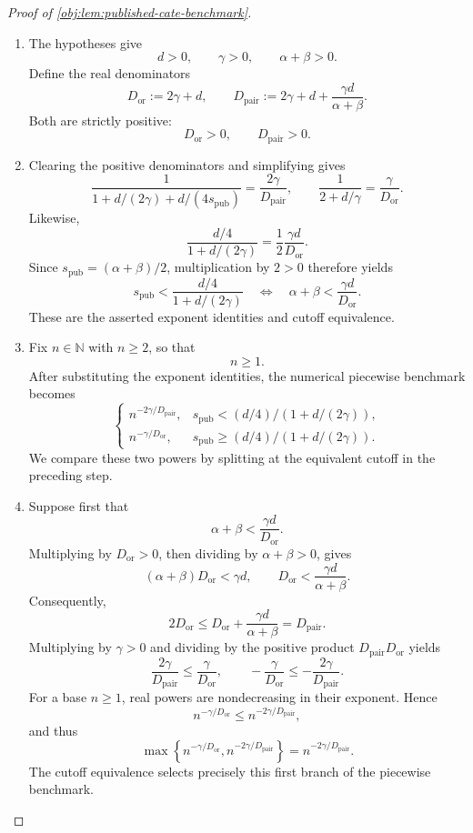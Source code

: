 \documentclass[11pt]{article}
\begin{document}
\begin{proof}[Proof of \cref{obj:lem:published-cate-benchmark}]
\begin{enumerate}
\item The hypotheses give
\[
d>0,\qquad \gamma>0,\qquad \alpha+\beta>0.
\]
Define the real denominators
\[
D_{\mathrm{or}}:=2\gamma+d,
\qquad
D_{\mathrm{pair}}:=2\gamma+d+\frac{\gamma d}{\alpha+\beta}.
\]
Both are strictly positive:
\[
D_{\mathrm{or}}>0,\qquad D_{\mathrm{pair}}>0.
\]

\item Clearing the positive denominators and simplifying gives
\[
\frac{1}{1+d/(2\gamma)+d/(4s_{\mathrm{pub}})}
=\frac{2\gamma}{D_{\mathrm{pair}}},
\qquad
\frac{1}{2+d/\gamma}
=\frac{\gamma}{D_{\mathrm{or}}}.
\]
Likewise,
\[
\frac{d/4}{1+d/(2\gamma)}
=\frac{1}{2}\frac{\gamma d}{D_{\mathrm{or}}}.
\]
Since \(s_{\mathrm{pub}}=(\alpha+\beta)/2\), multiplication by \(2>0\) therefore yields
\[
s_{\mathrm{pub}}<\frac{d/4}{1+d/(2\gamma)}
\quad\Longleftrightarrow\quad
\alpha+\beta<\frac{\gamma d}{D_{\mathrm{or}}}.
\]
These are the asserted exponent identities and cutoff equivalence.

\item Fix \(n\in\mathbb N\) with \(n\ge2\), so that
\[
n\ge1.
\]
After substituting the exponent identities, the numerical piecewise benchmark becomes
\[
\begin{cases}
n^{-2\gamma/D_{\mathrm{pair}}},
& s_{\mathrm{pub}}<(d/4)/(1+d/(2\gamma)),\\
n^{-\gamma/D_{\mathrm{or}}},
& s_{\mathrm{pub}}\ge(d/4)/(1+d/(2\gamma)).
\end{cases}
\]
We compare these two powers by splitting at the equivalent cutoff in the preceding step.

\item Suppose first that
\[
\alpha+\beta<\frac{\gamma d}{D_{\mathrm{or}}}.
\]
Multiplying by \(D_{\mathrm{or}}>0\), then dividing by \(\alpha+\beta>0\), gives
\[
(\alpha+\beta)D_{\mathrm{or}}<\gamma d,
\qquad
D_{\mathrm{or}}<\frac{\gamma d}{\alpha+\beta}.
\]
Consequently,
\[
2D_{\mathrm{or}}
\le D_{\mathrm{or}}+\frac{\gamma d}{\alpha+\beta}
=D_{\mathrm{pair}}.
\]
Multiplying by \(\gamma>0\) and dividing by the positive product
\(D_{\mathrm{pair}}D_{\mathrm{or}}\) yields
\[
\frac{2\gamma}{D_{\mathrm{pair}}}
\le\frac{\gamma}{D_{\mathrm{or}}},
\qquad
-\frac{\gamma}{D_{\mathrm{or}}}
\le-\frac{2\gamma}{D_{\mathrm{pair}}}.
\]
For a base \(n\ge1\), real powers are nondecreasing in their exponent. Hence
\[
n^{-\gamma/D_{\mathrm{or}}}
\le n^{-2\gamma/D_{\mathrm{pair}}},
\]
and thus
\[
\max\left\{
n^{-\gamma/D_{\mathrm{or}}},
n^{-2\gamma/D_{\mathrm{pair}}}
\right\}
=n^{-2\gamma/D_{\mathrm{pair}}}.
\]
The cutoff equivalence selects precisely this first branch of the piecewise benchmark.


\end{enumerate}
\end{proof}
\end{document}
